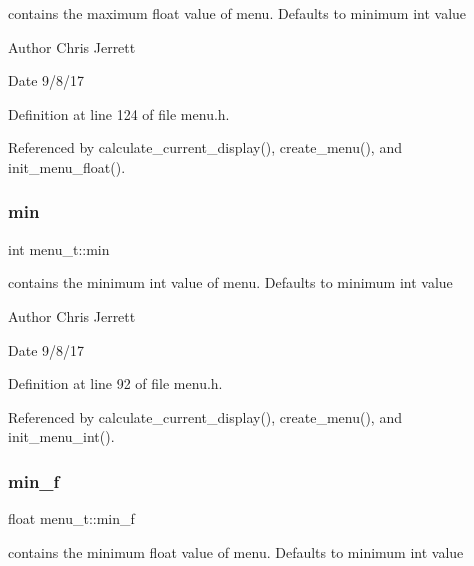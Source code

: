 contains the maximum float value of menu. Defaults to minimum int value 

\begin{DoxyAuthor}{Author}
Chris Jerrett 
\end{DoxyAuthor}
\begin{DoxyDate}{Date}
9/8/17 
\end{DoxyDate}


Definition at line 124 of file menu.\+h.



Referenced by calculate\+\_\+current\+\_\+display(), create\+\_\+menu(), and init\+\_\+menu\+\_\+float().

\mbox{\label{structmenu__t_a6891bc6c94f1e995cc62a05b13328de5}} 
\subsubsection{\texorpdfstring{min}{min}}
{\footnotesize\ttfamily int menu\+\_\+t\+::min}



contains the minimum int value of menu. Defaults to minimum int value 

\begin{DoxyAuthor}{Author}
Chris Jerrett 
\end{DoxyAuthor}
\begin{DoxyDate}{Date}
9/8/17 
\end{DoxyDate}


Definition at line 92 of file menu.\+h.



Referenced by calculate\+\_\+current\+\_\+display(), create\+\_\+menu(), and init\+\_\+menu\+\_\+int().

\mbox{\label{structmenu__t_a0a6e4f711992fb69e8a57c2af1ab7a05}} 
\subsubsection{\texorpdfstring{min\+\_\+f}{min\_f}}
{\footnotesize\ttfamily float menu\+\_\+t\+::min\+\_\+f}



contains the minimum float value of menu. Defaults to minimum int value 

